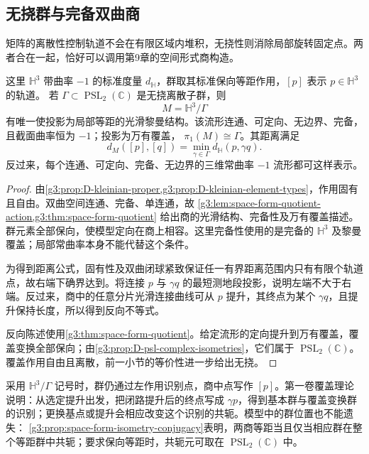 \subsection{无挠群与完备双曲商}
\label{g3:subsec:D04:03}

矩阵的离散性控制轨道不会在有限区域内堆积，无挠性则消除局部旋转固定点。两者合在一起，恰好可以调用第9章的空间形式商构造。

\begin{theorem}\label{g3:thm:D-kleinian-quotient}
	这里 \(\mathbb H^3\) 带曲率 \(-1\) 的标准度量 \(d_{\mathbb H}\)，群取其标准保向等距作用，\([p]\) 表示 \(p\in\mathbb H^3\) 的轨道。
	若 \(\Gamma\subset\operatorname{PSL}_2(\mathbb C)\) 是无挠离散子群，则
	\[
		M=\mathbb H^3/\Gamma
	\]
	有唯一使投影为局部等距的光滑黎曼结构。该流形连通、可定向、无边界、完备，且截面曲率恒为 \(-1\)；投影为万有覆盖，
	\(\pi_1(M)\cong\Gamma\)。其距离满足
	\begin{equation}\label{g3:eq:D-hyperbolic-quotient-distance}
		d_M([p],[q])=\min_{\gamma\in\Gamma}d_{\mathbb H}(p,\gamma q).
	\end{equation}
	反过来，每个连通、可定向、完备、无边界的三维常曲率 \(-1\) 流形都可这样表示。
\end{theorem}
\begin{proof}
	由\cref{g3:prop:D-kleinian-proper,g3:prop:D-kleinian-element-types}，作用固有且自由。双曲空间连通、完备、单连通，故
	\cref{g3:lem:space-form-quotient-action,g3:thm:space-form-quotient}
	给出商的光滑结构、完备性及万有覆盖描述。群元素全部保向，使模型定向在商上相容。这里完备性使用的是完备的 \(\mathbb H^3\) 及黎曼覆盖；局部常曲率本身不能代替这个条件。

	为得到距离公式，固有性及双曲闭球紧致保证任一有界距离范围内只有有限个轨道点，故右端下确界达到。将连接 \(p\) 与 \(\gamma q\) 的最短测地段投影，说明左端不大于右端。反过来，商中的任意分片光滑连接曲线可从 \(p\) 提升，其终点为某个 \(\gamma q\)，且提升保持长度，所以得到反向不等式。

	反向陈述使用\cref{g3:thm:space-form-quotient}。给定流形的定向提升到万有覆盖，覆盖变换全部保向；由\cref{g3:prop:D-psl-complex-isometries}，它们属于
	\(\operatorname{PSL}_2(\mathbb C)\)。覆盖作用自由且离散，前一小节的等价性进一步给出无挠。
\end{proof}

采用 \(\mathbb H^3/\Gamma\) 记号时，群仍通过左作用识别点，商中点写作 \([p]\)。第一卷覆盖理论说明：从选定提升出发，把闭路提升后的终点写成 \(\gamma p\)，得到基本群与覆盖变换群的识别；更换基点或提升会相应改变这个识别的共轭。模型中的群位置也不能遗失：
\cref{g3:prop:space-form-isometry-conjugacy}表明，两商等距当且仅当相应群在整个等距群中共轭；要求保向等距时，共轭元可取在
\(\operatorname{PSL}_2(\mathbb C)\) 中。

